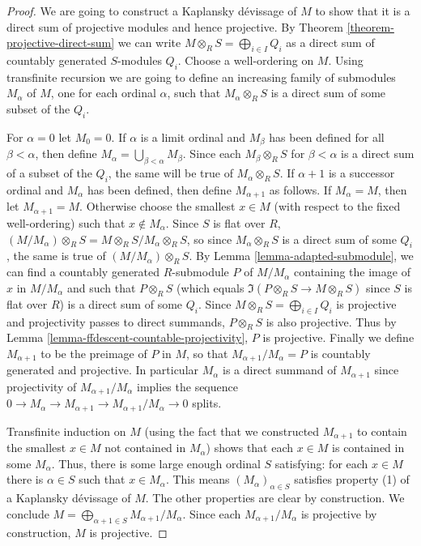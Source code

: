 \begin{proof}
We are going to construct a Kaplansky d\'evissage of $M$ to show that it is a
direct sum of projective modules and hence projective.  By Theorem
\ref{theorem-projective-direct-sum} we can write $M \otimes_R S =
\bigoplus_{i \in I} Q_i$ as a direct sum of countably generated $S$-modules
$Q_i$.  Choose a well-ordering on $M$.  Using transfinite recursion we are going
to define an increasing family of submodules $M_{\alpha}$ of $M$, one for each
ordinal $\alpha$, such that $M_{\alpha} \otimes_R S$ is a direct sum of some
subset of the $Q_i$.

\medskip\noindent
For $\alpha = 0$ let $M_0 = 0$.  If $\alpha$ is a limit ordinal and $M_{\beta}$
has been defined for all $\beta < \alpha$, then define $M_\alpha =
\bigcup_{\beta < \alpha} M_{\beta}$.  Since each $M_{\beta} \otimes_R S$ for
$\beta < \alpha$ is a direct sum of a subset of the $Q_i$, the same will be
true of $M_{\alpha} \otimes_R S$.  If $\alpha + 1$ is a successor ordinal and
$M_{\alpha}$ has been defined, then define $M_{\alpha + 1}$ as follows.  If
$M_{\alpha} = M$, then let $M_{\alpha +1} = M$.  Otherwise choose the smallest
$x \in M$ (with respect to the fixed well-ordering) such that $x \notin
M_{\alpha}$. Since $S$ is flat over $R$, $(M/M_{\alpha}) \otimes_R S = M
\otimes_R S/M_{\alpha} \otimes_R S$, so since $M_{\alpha} \otimes_R S$ is
a direct sum of some $Q_i$, the same is true of $(M/M_{\alpha}) \otimes_R
S$.   By Lemma \ref{lemma-adapted-submodule}, we can find a countably generated
$R$-submodule $P$ of $M/M_{\alpha}$ containing the image of $x$ in
$M/M_{\alpha}$ and such that $P \otimes_R S$ (which equals $\Im(P
\otimes_R S \to M \otimes_R S)$ since $S$ is flat over $R$) is a
direct sum of some $Q_i$. Since $M \otimes_R S = \bigoplus_{i \in I} Q_i$
is projective and projectivity passes to direct summands, $P \otimes_R S$ is
also projective.  Thus by Lemma \ref{lemma-ffdescent-countable-projectivity},
$P$ is projective.  Finally we define $M_{\alpha + 1}$ to be the preimage of $P$
in $M$, so that $M_{\alpha + 1}/M_{\alpha} = P$ is countably generated and
projective.  In particular $M_{\alpha}$ is a direct summand of $M_{\alpha + 1}$
since projectivity of $M_{\alpha + 1}/M_{\alpha}$ implies the sequence $0
\to M_{\alpha} \to M_{\alpha + 1} \to
M_{\alpha + 1}/M_{\alpha} \to 0$ splits.

\medskip\noindent
Transfinite induction on $M$ (using the fact that we constructed
$M_{\alpha + 1}$ to contain the smallest $x \in M$ not contained in
$M_{\alpha}$) shows that
each $x \in M$ is contained in some $M_{\alpha}$.  Thus, there is some large
enough ordinal $S$ satisfying: for each $x \in M$ there is $\alpha \in S$ such
that $x \in M_{\alpha}$.  This means $(M_{\alpha})_{\alpha \in S}$ satisfies
property (1) of a Kaplansky d\'evissage of $M$.  The other properties are clear
by construction.  We conclude
$M = \bigoplus_{\alpha + 1 \in S} M_{\alpha + 1}/M_{\alpha}$.
Since each $M_{\alpha + 1}/M_{\alpha}$ is projective
by construction, $M$ is projective.
\end{proof}












